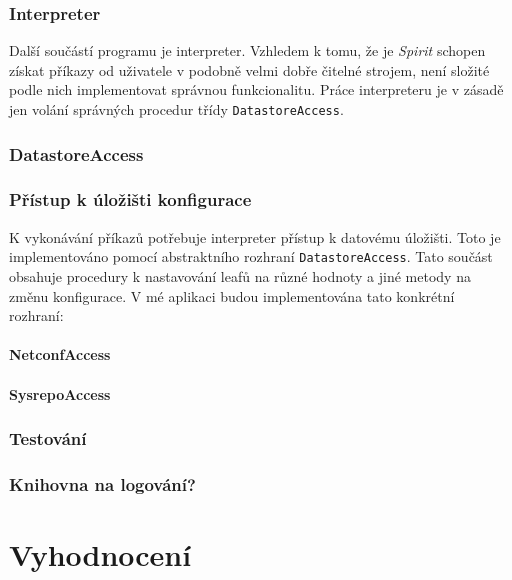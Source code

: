 \documentclass[thesis=B,czech,hidelinks]{FITthesis}[2019/03/06]
\begin{document}

\subsection{Interpreter}
Další součástí programu je interpreter. Vzhledem k tomu, že je \textit{Spirit} schopen získat příkazy od uživatele v podobně velmi dobře čitelné strojem, není složité podle nich implementovat správnou funkcionalitu. Práce interpreteru je v zásadě jen volání správných procedur třídy \texttt{DatastoreAccess}.

\subsection{DatastoreAccess}
\subsection{Přístup k úložišti konfigurace}
K vykonávání příkazů potřebuje interpreter přístup k datovému úložišti. Toto je implementováno pomocí abstraktního rozhraní \texttt{DatastoreAccess}. Tato součást obsahuje procedury k nastavování leafů na různé hodnoty a jiné metody na změnu konfigurace. V mé aplikaci budou implementována tato konkrétní rozhraní:

\subsubsection{NetconfAccess}

\subsubsection{SysrepoAccess}

\subsection{Testování}

\subsection{Knihovna na logování?}


\chapter{Vyhodnocení}
\end{document}
